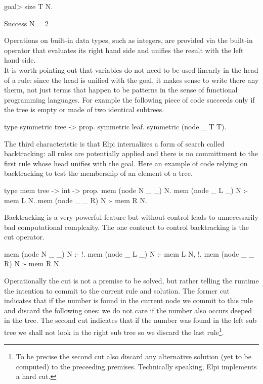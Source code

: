 \documentclass[a4paper, 11pt]{book}
\begin{document}
\begin{elpicode}
goal> size T N.

Success
  N = 2
\end{elpicode}
Operations on built-in data types, such as integers, are provided via
the built-in  operator that evaluates its right hand side
and unifies the result with the left hand side.
~\\
It is worth pointing out that variables do not need to be used linearly
in the head of a rule: since the head is unified with the goal, it makes sense to
write there any therm, not just terms that happen to be patterns in
the sense of functional programming languages. For example the following
piece of code succeeds only if the tree is empty or made of two
identical subtrees.

\begin{elpicode}
type symmetric tree -> prop.
symmetric leaf.
symmetric (node _ T T).
\end{elpicode}

The third characteristic is that Elpi internalizes a form of search called
backtracking: all rules are potentially applied and there is no committment to
the first rule whose head unifies with the goal.
Here an example of code relying on backtracking to test
the membership of an element ot a tree.

\begin{elpicode}
type mem tree -> int -> prop.
mem (node N _ _) N.
mem (node _ L _) N :- mem L N.
mem (node _ _ R) N :- mem R N.
\end{elpicode}
Backtracking is a very powerful feature but without control leads to
unnecessarily bad computational complexity. The one contruct to control
backtracking is the cut operator.

\begin{elpicode}
mem (node N _ _) N :- !.
mem (node _ L _) N :- mem L N, !.
mem (node _ _ R) N :- mem R N.
\end{elpicode}  
Operationally the cut is not a premise to be solved, but rather telling
the runtime the intention to commit to the current rule and solution.
The former cut indicates that if the number is found in the current node
we commit to this rule and discard the following ones: we do not care
if the number also occurs deeped in the tree. The second cut indicates
that if the number was found in the left sub tree we shall not look in
the right sub tree so we discard the last rule\footnote{To be precise
the second cut also discard any alternative solution (yet to be computed)
to the preceeding premises. Technically speaking, Elpi implements a hard cut.}.
\end{document}
